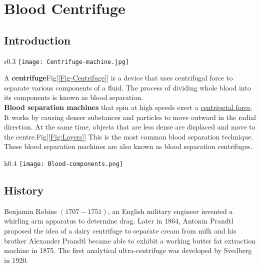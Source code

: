 \documentclass[12pt]{article}
\begin{document}
 \section{Blood Centrifuge}
 \subsection{Introduction}
 \begin{wrapfigure}{r}{0.3\textwidth}
 \centering
	\hspace{-30pt}
    \texttt{[image: Centrifuge-machine.jpg]}
    \caption{Centrifuge Machine}
    \label{Fig-Centrifuge}
\end{wrapfigure}
A \textbf{centrifuge}Fig[\ref{Fig-Centrifuge}] is a device that uses centrifugal force to separate various components of a fluid. The process of dividing whole blood into its components is known as blood separation.\cite{wiki:Centrifuge} \\
\textbf{Blood separation machines} that spin at high speeds exert a \href{https://byjus.com/physics/centripetal-and-centrifugal-force/}{centripetal force}, It works by causing denser substances and particles to move outward in the radial direction. At the same time, objects that are less dense are displaced and move to the centre.Fig[\ref{Fig:Layers}] This is the most common blood separation technique. These blood separation machines are also known as blood separation centrifuges.
 
\begin{wrapfigure}{h}{0.4\textwidth}
	\hspace{-20pt}
   \texttt{[image: Blood-components.png]}
  \caption{Layers}
    \label{Fig:Layers}
\end{wrapfigure}

\vspace{-10pt}
\subsection{History}
Benjamin Robins $(1707-1751)$, an English military engineer invented a whirling arm apparatus to determine drag. Later in 1864, Antonin Prandtl proposed the idea of a dairy centrifuge to separate cream from milk and his brother Alexander Prandtl became able to exhibit a working butter fat extraction machine in 1875. The first analytical ultra-centrifuge was developed by Svedberg in 1920.
\end{document}
